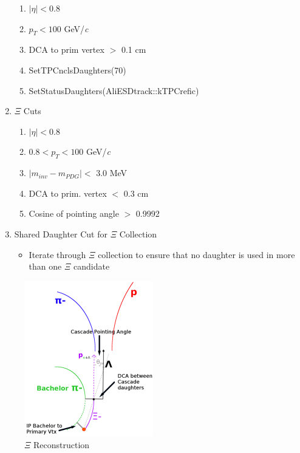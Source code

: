 \documentclass[../AnalysisNoteJBuxton.tex]{subfiles}
\begin{document}
\begin{enumerate}
 \begin{enumerate}
  \item $|\eta| < 0.8$
  \item $p_{T} < 100$ GeV/\textit{c}
  \item DCA to prim vertex $>$ 0.1 cm
  \item SetTPCnclsDaughters(70)
  \item SetStatusDaughters(AliESDtrack::kTPCrefic)
 \end{enumerate}
 \item $\Xi$ Cuts
 \begin{enumerate}
  \item $|\eta| < 0.8$
  \item $0.8 < p_{T} < 100$ GeV/\textit{c}
  \item $|m_{inv} - m_{PDG}| <$ 3.0 MeV
  \item DCA to prim. vertex $<$ 0.3 cm
  \item Cosine of pointing angle $>$ 0.9992
 \end{enumerate}
 
 
 \item Shared Daughter Cut for $\Xi$ Collection
 \begin{itemize}
  \item Iterate through $\Xi$ collection to ensure that no daughter is used in more than one $\Xi$ candidate
 \end{itemize} 
 
\end{enumerate}




\begin{figure}[h]
  \centering
  \includegraphics[width=0.5\textwidth]{3_DataSelection/Figures/XiCuts.pdf}
  \caption[$\Xi$ Reconstruction]{$\Xi$ Reconstruction}
  \label{fig:XiReconstruction}
\end{figure}
\end{document}

